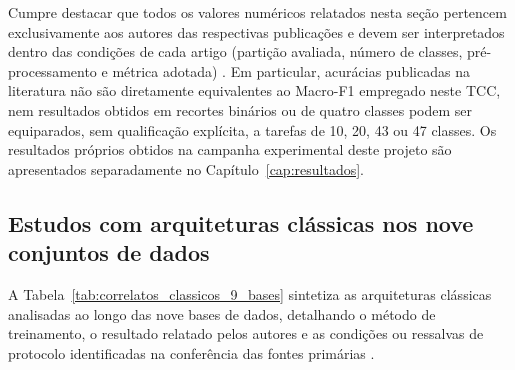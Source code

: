 \documentclass[
    12pt,
    openright,
    oneside,
    a4paper,
    english,
    brazil
]{abntex2}
\begin{document}
Cumpre destacar que todos os valores numéricos relatados nesta seção pertencem exclusivamente aos autores das respectivas publicações e devem ser interpretados dentro das condições de cada artigo (partição avaliada, número de classes, pré-processamento e métrica adotada) \cite{fawcett2006roc,sokolova2009systematic}. Em particular, acurácias publicadas na literatura não são diretamente equivalentes ao Macro-F1 empregado neste TCC, nem resultados obtidos em recortes binários ou de quatro classes podem ser equiparados, sem qualificação explícita, a tarefas de 10, 20, 43 ou 47 classes. Os resultados próprios obtidos na campanha experimental deste projeto são apresentados separadamente no Capítulo~\ref{cap:resultados}.

\subsection{Estudos com arquiteturas clássicas nos nove conjuntos de dados}
\label{subsec:correlatos_classicos}

A Tabela~\ref{tab:correlatos_classicos_9_bases} sintetiza as arquiteturas clássicas analisadas ao longo das nove bases de dados, detalhando o método de treinamento, o resultado relatado pelos autores e as condições ou ressalvas de protocolo identificadas na conferência das fontes primárias \cite{Wazlawick2020}.
\end{document}
